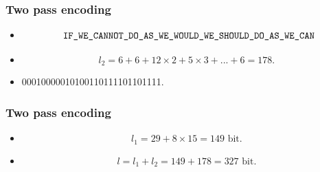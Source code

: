\documentclass[14pt]{beamer}
\begin{document}
\begin{frame}
\frametitle{Two pass encoding}
\begin{itemize}    


    \item {
    \footnotesize {
    \begin{equation}
    \label{ex2pass} {\texttt{
    IF{\_}WE{\_}CANNOT{\_}DO{\_}AS{\_}WE{\_}WOULD{\_}WE{\_}SHOULD{\_}DO{\_}AS{\_}WE{\_}CAN} }\\
    \end{equation}
    }
    }

    \item 
    \[
    l_2 = 6 + 6 + 12\times 2 + 5\times 3 + ... + 6 = 178.
    \]
    
    \item 
    \begin{center}
    00010000010100110111101101111.
    \end{center}

\end{itemize}
\end{frame}
    

\begin{frame}
\frametitle{Two pass encoding}
\begin{itemize}    
    
    \item 
    \[
    l_1 = 29 + 8\times 15 = 149\text{~bit}.
    \]
    
    \item 
    \begin{equation}
    \label{eq3_15} l = l_1 + l_2 = 149 + 178 = 327\text{~bit}.
    \end{equation}
   
\end{itemize}
\end{frame}
\end{document}
